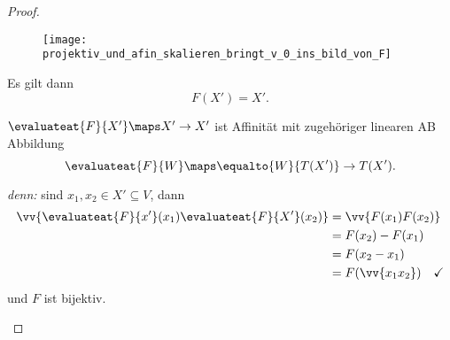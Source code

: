 \begin{proof}
\begin{proofdescription}
\begin{figure}[H]
      \centering
      \texttt{[image: projektiv\_und\_afin\_skalieren\_bringt\_v\_0\_ins\_bild\_von\_F]} %
      \label{fig:projektiv_und_afin_skalieren_bringt_v_0_ins_bild_von_F}
    \end{figure}
    Es gilt dann
    \begin{equation*}
      F(X')=X'.
    \end{equation*}
    \begin{behauptung*}
      \( \evaluateat{F}{X'}\maps X'\to X' \) ist Affinität mit zugehöriger linearen AB
      Abbildung
      \begin{equation*}
        \evaluateat{F}{W}\maps \equalto{W}{T(X')}\to T(X').
      \end{equation*}
    \end{behauptung*}
    \emph{denn:} sind \( x_1,x_2\in X'\subseteq V \), dann
    \begin{align*}
      \vv{\evaluateat{F}{x'}(x_1)\evaluateat{F}{X'}(x_2)}&=\vv{F(x_1)F(x_2)}\\
      &=F(x_2)-F(x_1)\\
      &=F(x_2-x_1)\\
      &=F(\vv{x_1 x_2})\quad \checkmark
    \end{align*}
    und \( F \) ist bijektiv.


\end{proofdescription}
\end{proof}
